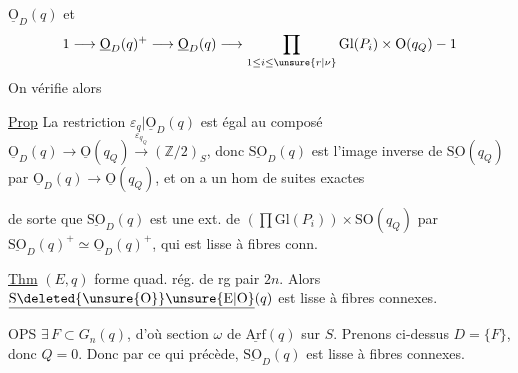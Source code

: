 $\underline{\mathrm O}_D(q)$ et
\[
1\longrightarrow\underline{\mathrm O}_D(q)^+\longrightarrow\underline{\mathrm O}_D(q)\longrightarrow\prod_{1\leq i\leq\unsure{r|\nu}}\mathrm{Gl}(P_i)\times\mathrm O(q_Q)\mathbin{-}1
\]
On vérifie alors


\uline{Prop} La restriction $\varepsilon_q|\underline{\mathrm O}_D(q)$ est égal au composé $\underline{\mathrm O}_D(q)\longrightarrow\underline{\mathrm O}(q_Q)\xrightarrow{\varepsilon_{q_Q}}(\mathbb Z/2)_S$, donc $\underline{\mathrm{SO}}_D(q)$ est l'image inverse de $\underline{\mathrm{SO}}(q_Q)$ par $\underline{\mathrm O}_D(q)\longrightarrow\underline{\mathrm O}(q_Q)$, et on a un hom de suites exactes

de sorte que $\underline{\mathrm{SO}}_D(q)$ est une ext. de $(\prod\mathrm{Gl}(P_i))\times\mathrm{SO}(q_Q)$ par $\underline{\mathrm{SO}}_D(q)^+\simeq\underline{\mathrm O}_D(q)^+$, qui est lisse à fibres conn.

\uline{Thm} $(E,q)$ forme quad. rég. de rg pair $2n$. Alors $\underline{\mathrm S\deleted{\unsure{\mathrm O}}\unsure{\mathrm E|\mathrm O}}(q)$ est lisse à fibres connexes.

OPS $\exists\,F\subset G_n(q)$, d'où section $\omega$ de $\underline{\mathrm{Arf}}(q)$ sur $S$. Prenons ci-dessus $D=\{F\}$,  donc $Q=0$. Donc par ce qui précède, $\underline{\mathrm{SO}}_D(q)$ est lisse à fibres connexes.
